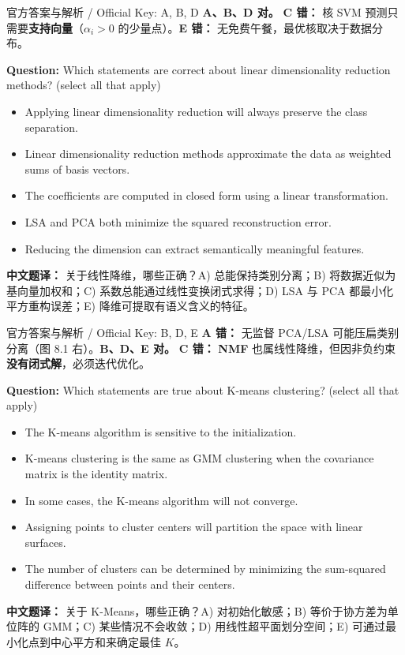 \begin{StudySolution}{官方答案与解析 / Official Key: A, B, D}
\textbf{A、B、D 对。} \textbf{C 错：} 核 SVM 预测只需要\textbf{支持向量}（$\alpha_i > 0$ 的少量点）。\textbf{E 错：} 无免费午餐，最优核取决于数据分布。
\end{StudySolution}

\textbf{Question:} Which statements are correct about linear dimensionality reduction methods? (select all that apply)
\begin{itemize}
\item[A)] Applying linear dimensionality reduction will always preserve the class separation.
\item[B)] Linear dimensionality reduction methods approximate the data as weighted sums of basis vectors.
\item[C)] The coefficients are computed in closed form using a linear transformation.
\item[D)] LSA and PCA both minimize the squared reconstruction error.
\item[E)] Reducing the dimension can extract semantically meaningful features.
\end{itemize}
\textbf{中文题译：} 关于线性降维，哪些正确？A) 总能保持类别分离；B) 将数据近似为基向量加权和；C) 系数总能通过线性变换闭式求得；D) LSA 与 PCA 都最小化平方重构误差；E) 降维可提取有语义含义的特征。

\begin{StudySolution}{官方答案与解析 / Official Key: B, D, E}
\textbf{A 错：} 无监督 PCA/LSA 可能压扁类别分离（图 8.1 右）。\textbf{B、D、E 对。} \textbf{C 错：} \textbf{NMF} 也属线性降维，但因非负约束\textbf{没有闭式解}，必须迭代优化。
\end{StudySolution}

\textbf{Question:} Which statements are true about K-means clustering? (select all that apply)
\begin{itemize}
\item[A)] The K-means algorithm is sensitive to the initialization.
\item[B)] K-means clustering is the same as GMM clustering when the covariance matrix is the identity matrix.
\item[C)] In some cases, the K-means algorithm will not converge.
\item[D)] Assigning points to cluster centers will partition the space with linear surfaces.
\item[E)] The number of clusters can be determined by minimizing the sum-squared difference between points and their centers.
\end{itemize}
\textbf{中文题译：} 关于 K-Means，哪些正确？A) 对初始化敏感；B) 等价于协方差为单位阵的 GMM；C) 某些情况不会收敛；D) 用线性超平面划分空间；E) 可通过最小化点到中心平方和来确定最佳 $K$。

